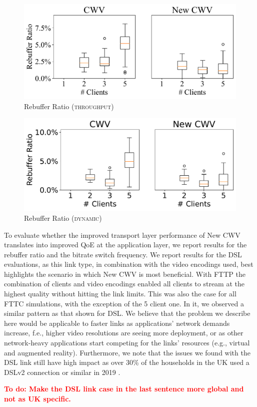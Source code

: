 \documentclass[10pt,sigconf]{acmart}
\newcommand{\todo}[1]{\textbf{\textcolor{red}{To do: #1}}}
\begin{document}
\begin{figure}
      \includegraphics[width=.45\textwidth, keepaspectratio]{figures/Rebuffer_Ratio.pdf}
    \caption{Rebuffer Ratio (\textsc{throughput})}
    \label{fig:rebuffer-ratio}
\end{figure}

\begin{figure}
  \includegraphics[width=.45\textwidth, keepaspectratio]{figures/Rebuffer_Ratio_dynamic.pdf}
\caption{Rebuffer Ratio (\textsc{dynamic})}
\label{fig:rebuffer-ratio-dynamic}
\end{figure}

To evaluate whether the improved transport layer performance of New CWV translates into improved QoE at the application layer, we report results for the rebuffer ratio and the bitrate switch frequency. We report results for the DSL evaluations, as this link type, in combination with the video encodings used, best highlights the scenario in which New CWV is most beneficial. With FTTP the combination of clients and video encodings enabled all clients to stream at the highest quality without hitting the link limits. This was also the case for all FTTC simulations, with the exception of the 5 client one. In it, we observed a similar pattern as that shown for DSL. We believe that the problem we describe here would be applicable to faster links as applications' network demands increase, f.e., higher video resolutions are seeing more deployment, or as other network-heavy applications start competing for the links' resources (e.g., virtual and augmented reality). Furthermore, we note that the issues we found with the DSL link still have high impact as over 30\% of the households in the UK used a DSLv2 connection or similar in 2019 \cite{online-ofcom-report}. 

\todo{Make the DSL link case in the last sentence more global and not as UK specific.}
\end{document}
